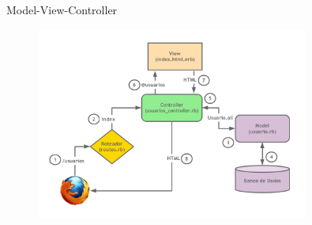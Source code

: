 \begin{frame}[t, fragile]{Model-View-Controller}
	\begin{figure}[h!]
		\centering
		\includegraphics[width=0.8\textwidth]{imagens/mvc.jpg}
	\end{figure}
\end{frame}
 
